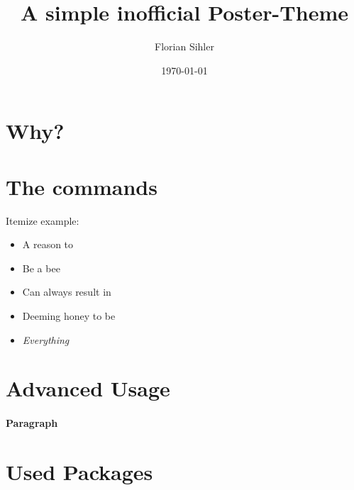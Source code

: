 \documentclass[a3paper, portrait, english, default]{uulm-cs-poster}
\title{A simple inofficial Poster-Theme}
\author{Florian Sihler}
\date{\today}
\begin{document}
\maketitle
\section*{Why?}
\lipsum[2]
\vfil
\begin{multicols}{3}
\section*{The commands}
   \lipsum[1-3]
   Itemize example:
   \begin{itemize}
      \item A reason to
      \item Be a bee
      \item Can always result in
      \item Deeming honey to be
      \item \textit{Everything}
   \end{itemize}
\section*{Advanced Usage}
   \lipsum[4-6]
   \paragraph{Paragraph}\lipsum[7]
\end{multicols}
\lipsum[2]
\section*{Used Packages}
\begin{multicols}{4}
   \lipsum[2]
   \printbibliography
\end{multicols}
\end{document}
